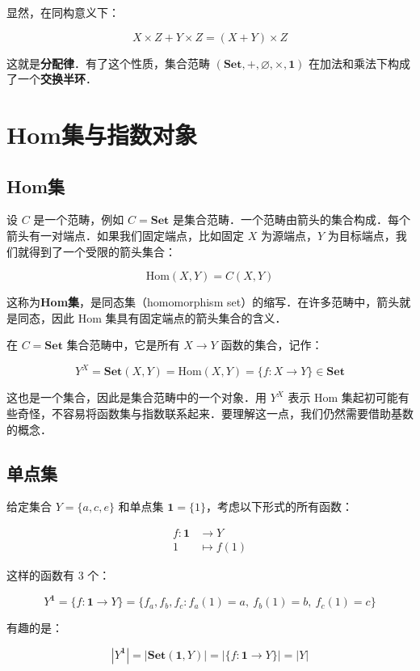 \documentclass[10pt, openany]{book}
\begin{document}
显然，在同构意义下：

\[
X \times Z + Y \times Z = (X+Y) \times Z
\]

这就是\textbf{分配律}．有了这个性质，集合范畴 $(\textbf{Set},+,\varnothing,\times,\mathbf{1})$ 在加法和乘法下构成了一个\textbf{交换半环}．

\chapter{Hom集与指数对象}

\section{Hom集}

设 $C$ 是一个范畴，例如 $C = \textbf{Set}$ 是集合范畴．一个范畴由箭头的集合构成．每个箭头有一对端点．如果我们固定端点，比如固定 $X$ 为源端点，$Y$ 为目标端点，我们就得到了一个受限的箭头集合：

$$
\text{Hom}(X,Y) = C(X,Y)
$$

这称为\textbf{Hom集}，是同态集（homomorphism set）的缩写．在许多范畴中，箭头就是同态，因此 Hom 集具有固定端点的箭头集合的含义．

在 $C = \textbf{Set}$ 集合范畴中，它是所有 $X \to Y$ 函数的集合，记作：

$$
Y^X = \textbf{Set}(X,Y) = \text{Hom}(X,Y) = \{f: X \to Y \} \in \textbf{Set}
$$

这也是一个集合，因此是集合范畴中的一个对象．用 $Y^X$ 表示 Hom 集起初可能有些奇怪，不容易将函数集与指数联系起来．要理解这一点，我们仍然需要借助基数的概念．

\section{单点集}

给定集合 $Y = \{a,c,e\}$ 和单点集 $\mathbf{1} = \{1\}$，考虑以下形式的所有函数：

$$
\begin{aligned}
f: \mathbf{1} &\to Y \\
1 &\mapsto f(1)
\end{aligned}
$$

这样的函数有 3 个：

$$
Y^{\mathbf{1}} = \{ f: \mathbf{1} \to Y\}
= \{ f_a,f_b,f_c: f_a(1) = a,\ f_b(1) = b,\ f_c(1) = c \}
$$

有趣的是：

$$
|Y^{\mathbf{1}}| = |\textbf{Set}(\mathbf{1},Y)| = |\{f: \mathbf{1} \to Y\}| = |Y|
$$
\end{document}

